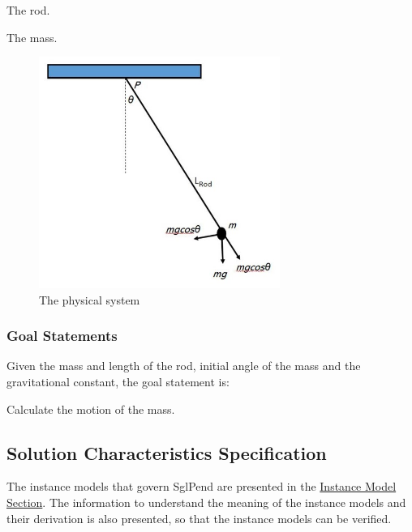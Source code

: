 \documentclass[12pt]{article}
\begin{document}
\begin{description}[font=\normalfont]
\item[PS1:]{The rod.}
\item[PS2:]{The mass.}
\end{description}
\begin{figure}[H]
\begin{center}
\includegraphics[width=0.7\textwidth]{../../../../datafiles/sglpend/sglpend.jpg}
\caption{The physical system}
\label{Figure:sglpend}
\end{center}
\end{figure}
\subsubsection{Goal Statements}
\label{Sec:GoalStmt}
Given the mass and length of the rod, initial angle of the mass and the gravitational constant, the goal statement is:

\begin{description}[font=\normalfont]
\item[Motion-of-the-mass:\phantomsection\label{motionMass}]{Calculate the motion of the mass.}
\end{description}
\subsection{Solution Characteristics Specification}
\label{Sec:SolCharSpec}
The instance models that govern SglPend are presented in the \hyperref[Sec:IMs]{Instance Model Section}. The information to understand the meaning of the instance models and their derivation is also presented, so that the instance models can be verified.
\end{document}
